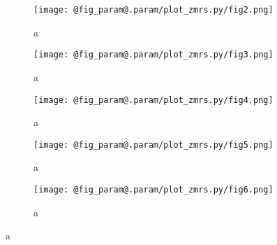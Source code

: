 \begin{figure}
  \begin{subfigure}{.5\textwidth}
    \centering\texttt{[image: @fig\_param@.param/plot\_zmrs.py/fig2.png]}
    \caption{a}
  \end{subfigure}
  \begin{subfigure}{.5\textwidth}
    \centering\texttt{[image: @fig\_param@.param/plot\_zmrs.py/fig3.png]}
    \caption{a}
  \end{subfigure}
  \begin{subfigure}{.5\textwidth}
    \centering\texttt{[image: @fig\_param@.param/plot\_zmrs.py/fig4.png]}
    \caption{a}
  \end{subfigure}%
  \begin{subfigure}{.5\textwidth}
    \centering\texttt{[image: @fig\_param@.param/plot\_zmrs.py/fig5.png]}
    \caption{a}
  \end{subfigure}
  \begin{subfigure}{.5\textwidth}
    \centering\texttt{[image: @fig\_param@.param/plot\_zmrs.py/fig6.png]}
    \caption{a}
  \end{subfigure}
  
\end{figure}
\clearpage
